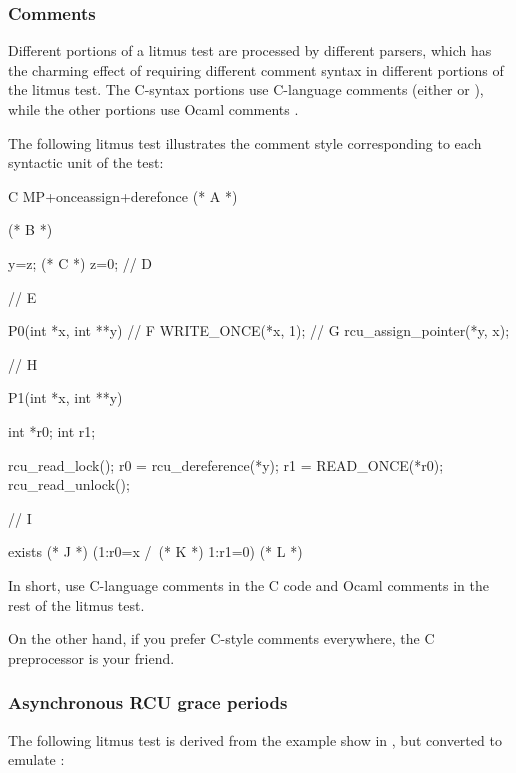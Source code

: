\subsubsection{Comments}

Different portions of a litmus test are processed by different parsers,
which has the charming effect of requiring different comment syntax in
different portions of the litmus test.
The C-syntax portions use C-language comments (either \qco{/* */} or \qco{//}),
while the other portions use Ocaml comments \qco{(* *)}.

The following litmus test illustrates the comment style corresponding
to each syntactic unit of the test:

\begin{VerbatimN}[commandchars=\%\@\$]
	C MP+onceassign+derefonce (* A *)

	(* B *)

	{
	y=z; (* C *)
	z=0;
	} // D

	// E

	P0(int *x, int **y) // F
	{
		WRITE_ONCE(*x, 1);  // G
		rcu_assign_pointer(*y, x);
	}

	// H

	P1(int *x, int **y)
	{
		int *r0;
		int r1;

		rcu_read_lock();
		r0 = rcu_dereference(*y);
		r1 = READ_ONCE(*r0);
		rcu_read_unlock();
	}

	// I

	exists (* J *) (1:r0=x /\ (* K *) 1:r1=0) (* L *)
\end{VerbatimN}

In short, use C-language comments in the C code and Ocaml comments in
the rest of the litmus test.

On the other hand, if you prefer C-style comments everywhere, the
C preprocessor is your friend.


\subsubsection{Asynchronous RCU grace periods}

The following litmus test is derived from the example show in
, but
converted to emulate :

